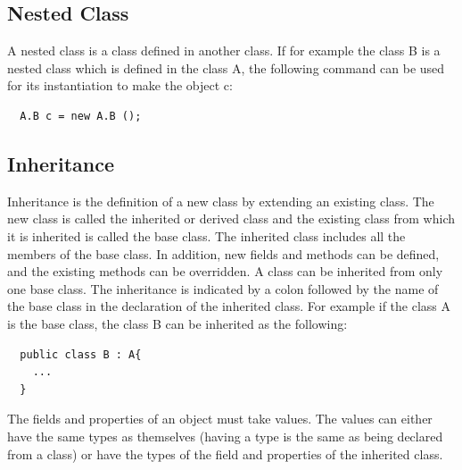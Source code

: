 \documentclass[11pt,twoside,a4paper]{fdyartcl}
\begin{document}
\subsection{Nested Class}
A nested class is a class defined in another class. If for example the class {\scriptsize B} is a nested class which is defined in the class {\scriptsize A}, the following command can be used for its instantiation to make the object {\scriptsize c}:
{\scriptsize \begin{verbatim}
  A.B c = new A.B ();
\end{verbatim}}
\subsection{Inheritance}
Inheritance is the definition of a new class by extending an existing class. The new class is called the inherited or derived class and the existing class from which it is inherited is called the base class. The inherited class includes all the members of the base class. In addition, new fields and methods can be defined, and the existing methods can be overridden. A class can be inherited from only one base class. The inheritance is indicated by a colon followed by the name of the base class in the declaration of the inherited class. For example if the class {\scriptsize A} is the base class, the class {\scriptsize B} can be inherited as the following:
{\scriptsize \begin{verbatim}
  public class B : A{
    ...
  }
\end{verbatim}}
The fields and properties of an object must take values. The values can either have the same types as themselves (having a type is the same as being declared from a class) or have the types of the field and properties of the inherited class.
\end{document}
